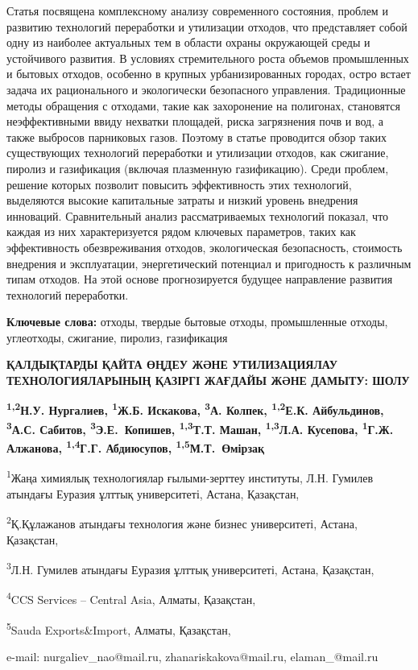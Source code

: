 Статья посвящена комплексному анализу современного состояния, проблем и
развитию технологий переработки и утилизации отходов, что представляет
собой одну из наиболее актуальных тем в области охраны окружающей среды
и устойчивого развития. В условиях стремительного роста объемов
промышленных и бытовых отходов, особенно в крупных урбанизированных
городах, остро встает задача их рационального и экологически безопасного
управления. Традиционные методы обращения с отходами, такие как
захоронение на полигонах, становятся неэффективными ввиду нехватки
площадей, риска загрязнения почв и вод, а также выбросов парниковых
газов. Поэтому в статье проводится обзор таких существующих технологий
переработки и утилизации отходов, как сжигание, пиролиз и газификация
(включая плазменную газификацию). Среди проблем, решение которых
позволит повысить эффективность этих технологий, выделяются высокие
капитальные затраты и низкий уровень внедрения инноваций. Сравнительный
анализ рассматриваемых технологий показал, что каждая из них
характеризуется рядом ключевых параметров, таких как эффективность
обезвреживания отходов, экологическая безопасность, стоимость внедрения
и эксплуатации, энергетический потенциал и пригодность к различным типам
отходов. На этой основе прогнозируется будущее направление развития
технологий переработки.

{\bfseries Ключевые слова:} отходы, твердые бытовые отходы, промышленные
отходы, углеотходы, сжигание, пиролиз, газификация
\vspace{-1em}

\begin{articleheader}
{\bfseries ҚАЛДЫҚТАРДЫ ҚАЙТА ӨҢДЕУ ЖӘНЕ УТИЛИЗАЦИЯЛАУ ТЕХНОЛОГИЯЛАРЫНЫҢ ҚАЗІРГІ ЖАҒДАЙЫ ЖӘНЕ ДАМЫТУ: ШОЛУ}

{\bfseries
\textsuperscript{1,2}Н.У. Нургалиев\textsuperscript{\envelope },
\textsuperscript{1}Ж.Б. Искакова\textsuperscript{\envelope },
\textsuperscript{3}А. Колпек,
\textsuperscript{1,2}Е.К. Айбульдинов\textsuperscript{\envelope },
\textsuperscript{3}А.С. Сабитов,
\textsuperscript{3}Э.Е.~Копишев,
\textsuperscript{1,3}Т.Т. Машан,
\textsuperscript{1,3}Л.А. Кусепова,
\textsuperscript{1}Г.Ж. Алжанова,
\textsuperscript{1,4}Г.Г. Абдиюсупов,
\textsuperscript{1,5}М.Т.~Өмірзақ
}
\end{articleheader}
\vspace{-1em}
\begin{articleheader}
\textsuperscript{1}Жаңа химиялық технологиялар ғылыми-зерттеу институты, Л.Н. Гумилев атындағы Еуразия ұлттық университеті, Астана, Қазақстан,

\textsuperscript{2}Қ.Құлажанов атындағы технология және бизнес университеті, Астана, Қазақстан,

\textsuperscript{3}Л.Н. Гумилев атындағы Еуразия ұлттық университеті, Астана, Қазақстан,

\textsuperscript{4}CCS Services -- Central Asia, Алматы, Қазақстан,

\textsuperscript{5}Sauda Exports\&Import, Алматы, Қазақстан,

e-mail: nurgaliev\_nao@mail.ru, zhanariskakova@mail.ru, elaman\_@mail.ru
\end{articleheader}

